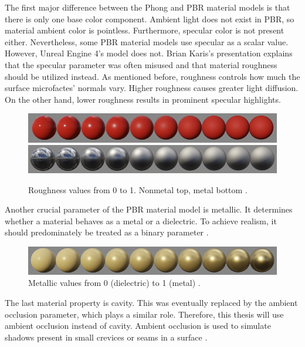 \documentclass[
  digital,     %
  oneside,     %
  nosansbold,  %
  nocolorbold, %
  lof,         %
  lot,         %
]{fithesis4}
\begin{document}
The first major difference between the Phong and PBR material models is that there is only one base color component.
Ambient light does not exist in PBR, so material ambient color is pointless. Furthermore, specular color is not
present either. Nevertheless, some PBR material models use specular as a scalar value. However, Unreal Engine 4's
model does not. Brian Karis's presentation \cite{ue-real-shading} explains that the specular parameter
was often misused and that material roughness should be utilized instead. As mentioned before, roughness controls
how much the surface microfactes' normals vary. Higher roughness causes greater light diffusion. On the other
hand, lower roughness results in prominent specular highlights.
\begin{figure}[H]
    \centering
    \includegraphics[width=\textwidth]{images/roughness_nonmetal.png}
    \includegraphics[width=\textwidth]{images/roughness_metal.png}
    \caption{Roughness values from 0 to 1. Nonmetal top, metal bottom \cite{ue-pbr}.}
    \label{fig:roughness}
\end{figure}

Another crucial parameter of the PBR material model is metallic.
It determines whether a material behaves as a metal or a dielectric.
To achieve realism, it should predominately be treated as a binary parameter \cite{ue-pbr}.
\begin{figure}[H]
    \centering
    \includegraphics[width=\textwidth]{images/metallic.png}
    \caption{Metallic values from 0 (dielectric) to 1 (metal) \cite{ue-pbr}.}
    \label{fig:metallic}
\end{figure}

The last material property is cavity. This was eventually replaced by the ambient occlusion parameter,
which plays a similar role. Therefore, this thesis will use ambient occlusion instead of cavity.
Ambient occlusion is used to simulate shadows present in small crevices or seams in a surface
\cite{ue-real-shading}\cite{ue-material-inputs}.
\end{document}
